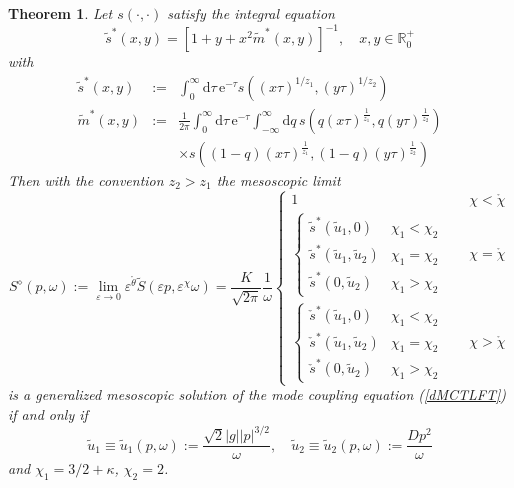 \documentclass[12pt]{article}
\newcommand{\rmd}{\mathrm{d}}
\newcommand{\rme}{\mathrm{e}}
\newcommand{\R}{{\mathbb R}}
\newtheorem{theorem}{Theorem}[section]
\begin{document}
\begin{theorem}
\label{Theo:1}
Let $s (\cdot,\cdot)$ 
satisfy the integral equation
\begin{equation}
\tilde{s}^{\ast} (x,y)
=  \left[1+ y + x^2 \tilde{m}^{\ast}(x,y) \right]^{-1}, 
\quad x,y \in \R_0^+
\label{MCTint}
\end{equation}
with 
\begin{eqnarray}
\tilde{s}^\ast(x,y) & := &
\int_{0}^\infty \rmd \tau \, \rme^{- \tau}
s ((x \tau)^{1/z_1}, (y \tau)^{1/z_2}) 
\\
\tilde{m}^\ast(x,y) & := & \frac{1}{2\pi} 
\int_{0}^{\infty} \rmd \tau \, \rme^{-\tau} 
\int_{- \infty}^{\infty} \rmd q \, 
s(q (x\tau)^{\frac{1}{z_1}}, q (y\tau)^{\frac{1}{z_2}})
\nonumber \\ & & \times
s((1-q) (x\tau)^{\frac{1}{z_1}}, (1-q) (y\tau)^{\frac{1}{z_2}})
\end{eqnarray}
Then with the convention $z_2>z_1$ the mesoscopic limit
\begin{equation}
S^{\diamond}(p,\omega)  := 
\lim_{\varepsilon \to 0} \varepsilon^{\mathring{\theta}}
\tilde{S}(\varepsilon p,\varepsilon^{\chi}\omega) = \frac{K}{\sqrt{2\pi}} \frac{1}{\omega} 
\left\{\begin{array}{ll} 
1 & \chi < \mathring{\chi} \\[2mm]
\left\{\begin{array}{ll}
\tilde{s}^\ast(\tilde{u}_1,0) & \chi_1 < \chi_2  \\[2mm]
\tilde{s}^\ast(\tilde{u}_1,\tilde{u}_2) & \chi_1 = \chi_2  \\[2mm]
\tilde{s}^\ast(0,\tilde{u}_2) & \chi_1 > \chi_2 
\end{array} \right. 
\quad & \chi = \mathring{\chi} \\[8mm]
\left\{
\begin{array}{ll}
\check{s}^\ast(\tilde{u}_1,0) & \chi_1 < \chi_2  \\[2mm]
\check{s}^\ast(\tilde{u}_1,\tilde{u}_2) & \chi_1 = \chi_2  \\[2mm]
\check{s}^\ast(0,\tilde{u}_2) & \chi_1 > \chi_2 
\end{array} \right. 
& \chi > \mathring{\chi}
\end{array} \right.
\label{DSFtheo} 
\end{equation}
is a generalized mesoscopic solution of the mode coupling equation
(\ref{dMCTLFT})
if and only if 
\begin{equation}
\tilde{u}_1 \equiv \tilde{u}_1(p,\omega) :=  \frac{\sqrt{2} |g| |p|^{3/2}}{\omega}, \quad 
\tilde{u}_2 \equiv \tilde{u}_2(p,\omega) := \frac{D p^{2}}{\omega}
\label{u1u2theo1}
\end{equation}
and $\chi_1=3/2+\kappa$, $\chi_2 = 2$. 
\end{theorem}
\end{document}
